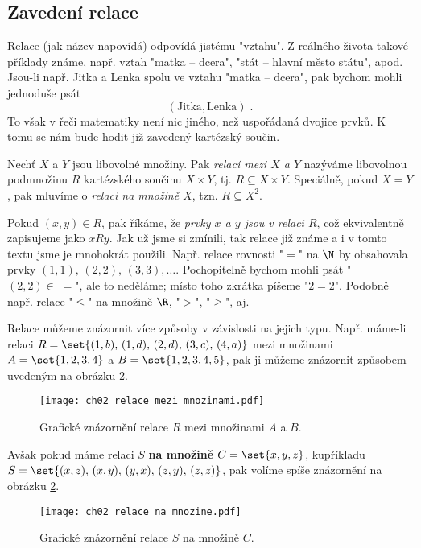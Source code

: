 \subsection{Zavedení relace}
Relace (jak název napovídá) odpovídá jistému "vztahu". Z reálného života takové příklady známe, např. vztah "matka -- dcera", "stát -- hlavní město státu", apod. Jsou-li např. Jitka a Lenka spolu ve vztahu "matka -- dcera", pak bychom mohli jednoduše psát
\begin{equation*}
    (\text{Jitka}, \text{Lenka})\; .
\end{equation*}
To však v řeči matematiky není nic jiného, než uspořádaná dvojice prvků. K tomu se nám bude hodit již zavedený kartézský součin.
\begin{definition}[Relace]\label{def:relace}
    Nechť $X$ a $Y$ jsou libovolné množiny. Pak \emph{relací mezi $X$ a $Y$} nazýváme libovolnou podmnožinu $R$ kartézského součinu $X\times Y$, tj. $R\subseteq X \times Y$. Speciálně, pokud $X=Y$, pak mluvíme o \emph{relaci na množině $X$}, tzn. $R\subseteq X^2$.
\end{definition}
Pokud $(x,y)\in R$, pak říkáme, že \emph{prvky $x$ a $y$ jsou v relaci $R$}, což ekvivalentně zapisujeme jako $xRy$. Jak už jsme si zmínili, tak relace již známe a i v tomto textu jsme je mnohokrát použili. Např. relace rovnosti "$=$" na $\N$ by obsahovala prvky $(1,1),\,(2,2),\,(3,3),\ldots$. Pochopitelně bychom mohli psát "$(2,2)\in\;=$", ale to neděláme; místo toho zkrátka píšeme "$2=2$". Podobně např. relace "$\leq$" na množině $\R$, "$>$", "$\geq$", aj.\par
Relace můžeme znázornit více způsoby v závislosti na jejich typu. Např. máme-li relaci $R=\set{(1,b),\,(1,d),\,(2,d),\,(3,c),\,(4,a)}$ mezi množinami $A=\set{1,2,3,4}$ a $B=\set{1,2,3,4,5}$, pak ji můžeme znázornit způsobem uvedeným na obrázku \ref{fig:relace_mezi_mnozinami}.
\begin{figure}[h]
    \centering
    \texttt{[image: ch02\_relace\_mezi\_mnozinami.pdf]}
    \caption{Grafické znázornění relace $R$ mezi množinami $A$ a $B$.}
    \label{fig:relace_mezi_mnozinami}
\end{figure}
Avšak pokud máme relaci $S$ \textbf{na množině} $C=\set{x,y,z}$, kupříkladu $S=\set{(x,z),\,(x,y),\,(y,x),\,(z,y),\,(z,z)}$, pak volíme spíše znázornění na obrázku \ref{fig:relace_mezi_mnozinami}.
\begin{figure}[h]
    \centering
    \texttt{[image: ch02\_relace\_na\_mnozine.pdf]}
    \caption{Grafické znázornění relace $S$ na množině $C$.}
    \label{fig:relace_mezi_mnozinami}
\end{figure}
